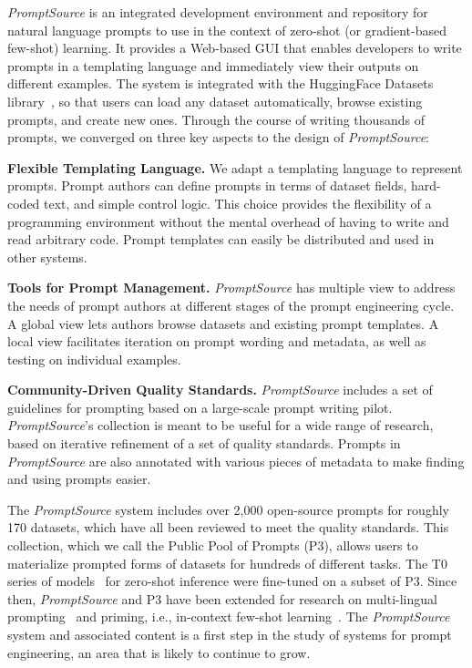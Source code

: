 \textit{PromptSource} is an integrated development environment and repository for natural language prompts to use in the context of zero-shot (or gradient-based few-shot)  learning. It provides a Web-based GUI that enables developers to write prompts in a templating language and immediately view their outputs on different examples. The system is integrated with the HuggingFace Datasets library~\citep{lhoest-etal-2021-datasets}, so that users can load any dataset automatically, browse existing prompts, and create new ones. Through the course of writing thousands of prompts, we converged on three key aspects to the design of \textit{PromptSource}:

\begin{compactitem}
\item {\bf Flexible Templating Language.} We adapt a templating language to represent prompts. Prompt authors can define prompts in terms of dataset fields, hard-coded text, and simple control logic. This choice provides the flexibility of a programming environment without the mental overhead of having to write and read arbitrary code. Prompt templates can easily be distributed and used in other systems.
\item {\bf Tools for Prompt Management.}
\textit{PromptSource} has multiple view to address the needs of prompt authors at different stages of the prompt engineering cycle. A global view lets authors browse datasets and existing prompt templates. A local view facilitates iteration on prompt wording and metadata, as well as testing on individual examples.

\item {\bf Community-Driven Quality Standards.}
 \textit{PromptSource} includes a set of guidelines for prompting based on a large-scale prompt writing pilot.
\textit{PromptSource}'s collection is meant to be useful for a wide range of research, based on iterative refinement of a set of quality standards. Prompts in \textit{PromptSource} are also annotated with various pieces of metadata to make finding and using prompts easier.
\end{compactitem}

The \textit{PromptSource} system includes over 2,000 open-source prompts for roughly 170 datasets, which have all been reviewed to meet the quality standards. This collection, which we call the Public Pool of Prompts (P3), allows users to materialize prompted forms of datasets for hundreds of different tasks. The T0 series of models~\citep{sanh2021multitask} for zero-shot inference were fine-tuned on a subset of P3. Since then, \textit{PromptSource} and P3 have been extended for research on multi-lingual prompting~\citep{lin2021multilingual} and priming, i.e., in-context few-shot learning~\citep{metaicl}. The \textit{PromptSource} system and associated content is a first step in the study of systems for prompt engineering, an area that is likely to continue to grow.

